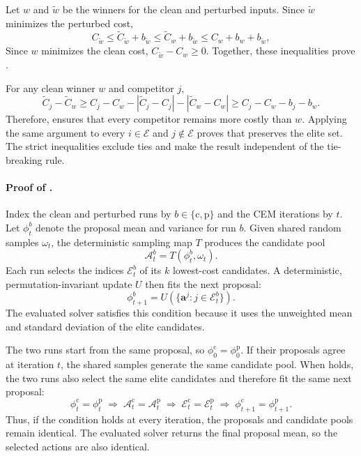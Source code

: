 \documentclass[10pt]{article}
\begin{document}
Let $w$ and $\tilde w$ be the winners for the clean and perturbed inputs. Since
$\tilde w$ minimizes the perturbed cost,
\[
C_{\tilde w}
\leq \tilde C_{\tilde w}+b_{\tilde w}
\leq \tilde C_w+b_{\tilde w}
\leq C_w+b_w+b_{\tilde w},
\]
Since $w$ minimizes the clean cost, $C_{\tilde w}-C_w\geq0$. Together, these
inequalities prove .

For any clean winner $w$ and competitor $j$,
\[
\tilde C_j-\tilde C_w
\ge C_j-C_w-|\tilde C_j-C_j|-|\tilde C_w-C_w|
\ge C_j-C_w-b_j-b_w.
\]
Therefore,  ensures that every competitor
remains more costly than $w$. Applying the same argument to every
$i\in\mathcal E$ and $j\notin\mathcal E$ proves that
 preserves the elite set. The strict
inequalities exclude ties and make the result independent of the tie-breaking
rule.

\paragraph{Proof of .}
Index the clean and perturbed runs by $b\in\{\mathrm c,\mathrm p\}$ and the CEM
iterations by $t$. Let $\phi_t^b$ denote the proposal mean and variance for
run $b$. Given shared random samples $\omega_t$, the deterministic sampling
map $T$ produces the candidate pool
\[
\mathcal A_t^b=T(\phi_t^b,\omega_t).
\]
Each run selects the indices $\mathcal E_t^b$ of its $k$ lowest-cost
candidates. A deterministic, permutation-invariant update $U$ then fits the
next proposal:
\[
\phi_{t+1}^b
=U(\{\mathbf a^j:j\in\mathcal E_t^b\}).
\]
The evaluated solver satisfies this condition because it uses the unweighted
mean and standard deviation of the elite candidates.

The two runs start from the same proposal, so
$\phi_0^{\mathrm c}=\phi_0^{\mathrm p}$. If their proposals agree at iteration
$t$, the shared samples generate the same candidate pool. When
 holds, the two runs also select the same elite
candidates and therefore fit the same next proposal:
\[
\phi_t^{\mathrm c}=\phi_t^{\mathrm p}
\;\Longrightarrow\;
\mathcal A_t^{\mathrm c}=\mathcal A_t^{\mathrm p}
\;\Longrightarrow\;
\mathcal E_t^{\mathrm c}=\mathcal E_t^{\mathrm p}
\;\Longrightarrow\;
\phi_{t+1}^{\mathrm c}=\phi_{t+1}^{\mathrm p}.
\]
Thus, if the condition holds at every iteration, the proposals and candidate
pools remain identical. The evaluated solver returns the final proposal mean,
so the selected actions are also identical.
\end{document}
